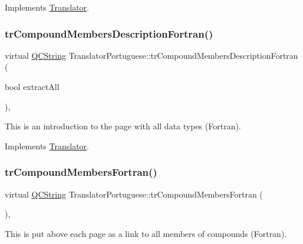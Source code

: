 Implements \mbox{\hyperlink{class_translator}{Translator}}.

\mbox{\label{class_translator_portuguese_a4d41bc71ac5698f2ce1486d2a2f8e74d}} 
\subsubsection{\texorpdfstring{trCompoundMembersDescriptionFortran()}{trCompoundMembersDescriptionFortran()}}
{\footnotesize\ttfamily virtual \mbox{\hyperlink{class_q_c_string}{Q\+C\+String}} Translator\+Portuguese\+::tr\+Compound\+Members\+Description\+Fortran (\begin{DoxyParamCaption}\item[{bool}]{extract\+All }\end{DoxyParamCaption})\hspace{0.3cm}{\ttfamily [inline]}, {\ttfamily [virtual]}}

This is an introduction to the page with all data types (Fortran). 

Implements \mbox{\hyperlink{class_translator}{Translator}}.

\mbox{\label{class_translator_portuguese_afac21e3d9033517a4a53923b40241a56}} 
\subsubsection{\texorpdfstring{trCompoundMembersFortran()}{trCompoundMembersFortran()}}
{\footnotesize\ttfamily virtual \mbox{\hyperlink{class_q_c_string}{Q\+C\+String}} Translator\+Portuguese\+::tr\+Compound\+Members\+Fortran (\begin{DoxyParamCaption}{ }\end{DoxyParamCaption})\hspace{0.3cm}{\ttfamily [inline]}, {\ttfamily [virtual]}}

This is put above each page as a link to all members of compounds (Fortran). 

